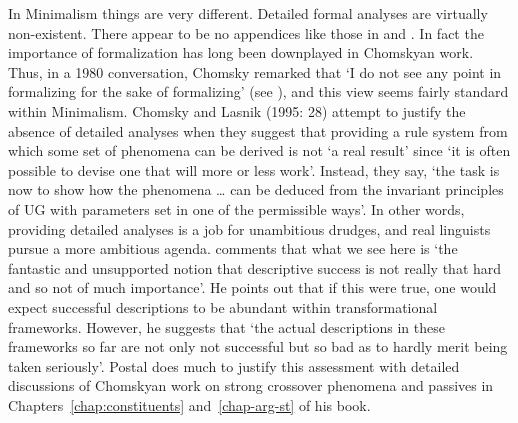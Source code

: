 \documentclass[output=paper]{langsci/langscibook}
\begin{document}
In Minimalism things are very different. Detailed formal analyses are virtually non-existent. There
appear to be no appendices like those in \citet{Sag97a} and \citet{GSag2000a-u}. In fact the
importance of formalization has long been downplayed in Chomskyan work. Thus, in a 1980
conversation, Chomsky remarked that `I do not see any point in formalizing for the sake of
formalizing' (see \citealt[73]{HuybregtsRiemsdijk.1982}), and this view
seems fairly standard within Minimalism. Chomsky and Lasnik (1995: 28) attempt to justify the absence of detailed analyses when they suggest that providing a rule
system from which some set of phenomena can be derived is not `a real result' since `it is often
possible to devise one that will more or less work'. Instead, they say, `the task is now to show how
the phenomena \ldots{} can be deduced from the invariant principles of UG with parameters set in one
of the permissible ways'. In other words, providing detailed analyses is a job for unambitious
drudges, and real linguists pursue a more ambitious agenda. \citet[5]{Postal2004a-u} comments that
what we see here is `the fantastic and unsupported notion that descriptive success is not really
that hard and so not of much importance'. He points out that if this were true, one would expect
successful descriptions to be abundant within transformational frameworks. However, he suggests that
`the actual descriptions in these frameworks so far are not only not successful but so bad as to
hardly merit being taken seriously'. Postal does much to justify this assessment with detailed
discussions of Chomskyan work on strong crossover phenomena and passives in
Chapters~\ref{chap:constituents} and~\ref{chap-arg-st} of his book. 
\end{document}
